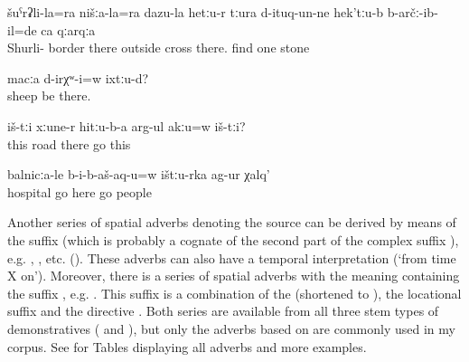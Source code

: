\begin{exe}
	\ex	\label{ex:We crossed the border between Shurli and our (Sanzhi area), and up there we found a stone}
	\gll	šuˁrʡli-la=ra	nišːa-la=ra	dazu-la	hetːu-r	tːura	d-ituq-un-ne	hek'tːu-b	b-arčː-ib-il=de	ca	qːarqːa\\
		Shurli-		border	there	outside	cross	there.	find	one	stone\\
	\glt	{}

	\ex	\label{ex:Were there sheep up there}
	\gll	macːa	d-irχʷ-i=w	ixtːu-d?\\
		sheep	be	there.\\
	\glt	{}

	\ex	\label{ex:They are walking on (along) the road there, right, these}
	\gll	iš-tːi	xːune-r	hitːu-b-a	arg-ul akːu=w	iš-tːi?\\
		this	road	there	go 	this\\
	\glt	{}

	\ex	\label{ex:Do they really allow people from here (to enter) the hospital}
	\gll	balnicːa-le	b-i-b-aš-aq-u=w	ištːu-rka	ag-ur	χalq'\\
		hospital	go	here	go	people\\
	\glt	{}
\end{exe}

Another series of spatial adverbs denoting the source can be derived by means of the suffix  (which is probably a cognate of the second part of the complex  suffix ), e.g.  ,  , etc. (). These adverbs can also have a temporal interpretation (`from time X on'). Moreover, there is a series of spatial adverbs with the meaning  containing the suffix , e.g.   . This suffix is a combination of the   (shortened to ), the locational suffix  and the directive . Both series are available from all three stem types of demonstratives (  and ), but only the adverbs based on  are commonly used in my corpus. See  for Tables displaying all adverbs and more examples. 

